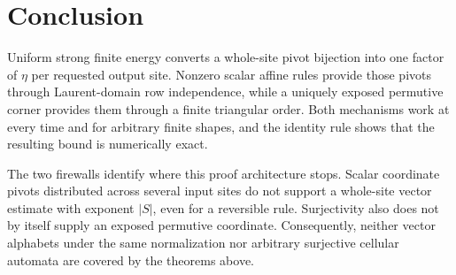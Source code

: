 \section{Conclusion}\label{sec:conclusion}

Uniform strong finite energy converts a whole-site pivot bijection into one
factor of $\eta$ per requested output site.  Nonzero scalar affine rules
provide those pivots through Laurent-domain row independence, while a
uniquely exposed permutive corner provides them through a finite triangular
order.  Both mechanisms work at every time and for arbitrary finite shapes,
and the identity rule shows that the resulting bound is numerically exact.

The two firewalls identify where this proof architecture stops.  Scalar
coordinate pivots distributed across several input sites do not support a
whole-site vector estimate with exponent $|S|$, even for a reversible rule.
Surjectivity also does not by itself supply an exposed permutive coordinate.
Consequently, neither vector alphabets under the same normalization nor
arbitrary surjective cellular automata are covered by the theorems above.

